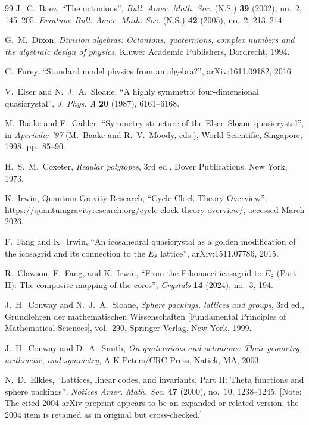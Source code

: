 \documentclass{article}
\begin{document}
\begin{thebibliography}{99}
J.~C.~Baez,
``The octonions'',
\emph{Bull. Amer. Math. Soc.} (N.S.) \textbf{39} (2002), no.~2, 145--205.
\emph{Erratum}: \emph{Bull. Amer. Math. Soc.} (N.S.) \textbf{42} (2005), no.~2, 213--214.

G.~M.~Dixon,
\emph{Division algebras: Octonions, quaternions, complex numbers and the algebraic design of physics},
Kluwer Academic Publishers, Dordrecht, 1994.

C.~Furey,
``Standard model physics from an algebra?'',
arXiv:1611.09182, 2016.

V.~Elser and N.~J.~A.~Sloane,
``A highly symmetric four-dimensional quasicrystal'',
\emph{J. Phys. A} \textbf{20} (1987), 6161--6168.

M.~Baake and F.~G\"ahler,
``Symmetry structure of the Elser--Sloane quasicrystal'',
in \emph{Aperiodic '97} (M.~Baake and R.~V.~Moody, eds.), World Scientific, Singapore, 1998, pp.~85--90.

H.~S.~M.~Coxeter,
\emph{Regular polytopes},
3rd ed., Dover Publications, New York, 1973.

K.~Irwin, Quantum Gravity Research,
``Cycle Clock Theory Overview'',
\url{https://quantumgravityresearch.org/cycle clock-theory-overview/}, accessed March 2026.

F.~Fang and K.~Irwin,
``An icosahedral quasicrystal as a golden modification of the icosagrid and its connection to the $E_8$ lattice'',
arXiv:1511.07786, 2015.

R.~Clawson, F.~Fang, and K.~Irwin,
``From the Fibonacci icosagrid to $E_8$ (Part II): The composite mapping of the cores'',
\emph{Crystals} \textbf{14} (2024), no.~3, 194.

J.~H.~Conway and N.~J.~A.~Sloane,
\emph{Sphere packings, lattices and groups},
3rd ed., Grundlehren der mathematischen Wissenschaften [Fundamental Principles of Mathematical Sciences], vol.~290,
Springer-Verlag, New York, 1999.

J.~H.~Conway and D.~A.~Smith,
\emph{On quaternions and octonions: Their geometry, arithmetic, and symmetry},
A K Peters/CRC Press, Natick, MA, 2003.

N.~D.~Elkies,
``Lattices, linear codes, and invariants, Part II: Theta functions and sphere packings'',
\emph{Notices Amer. Math. Soc.} \textbf{47} (2000), no.~10, 1238--1245.
[Note: The cited 2004 arXiv preprint appears to be an expanded or related version; the 2004 item is retained as in original but cross-checked.]


\end{thebibliography}
\end{document}
